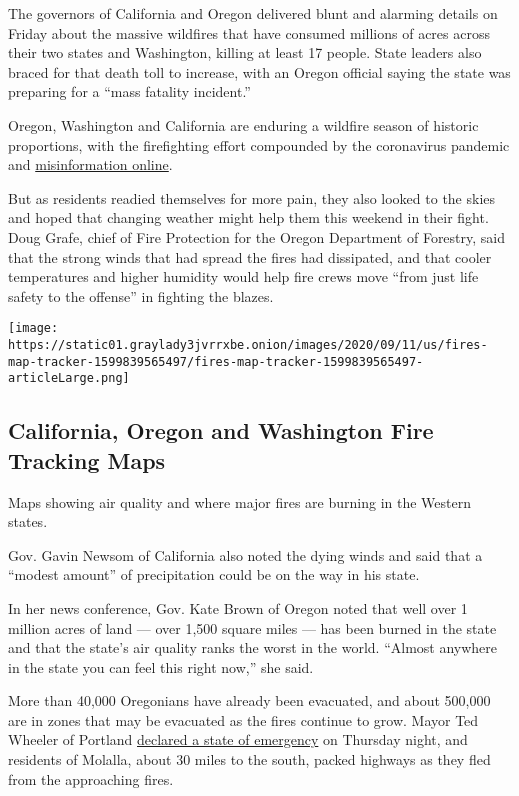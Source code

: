 The governors of California and Oregon delivered blunt and alarming
details on Friday about the massive wildfires that have consumed
millions of acres across their two states and Washington, killing at
least 17 people. State leaders also braced for that death toll to
increase, with an Oregon official saying the state was preparing for a
``mass fatality incident.''

Oregon, Washington and California are enduring a wildfire season of
historic proportions, with the firefighting effort compounded by the
coronavirus pandemic and
\href{https://www.nytimes3xbfgragh.onion/2020/09/10/us/wildfires-misinformation-arson-activists.html}{misinformation
online}.

But as residents readied themselves for more pain, they also looked to
the skies and hoped that changing weather might help them this weekend
in their fight. Doug Grafe, chief of Fire Protection for the Oregon
Department of Forestry, said that the strong winds that had spread the
fires had dissipated, and that cooler temperatures and higher humidity
would help fire crews move ``from just life safety to the offense'' in
fighting the blazes.

\href{https://www.nytimes3xbfgragh.onion/interactive/2020/us/fires-map-tracker.html}{}

\texttt{[image: https://static01.graylady3jvrrxbe.onion/images/2020/09/11/us/fires-map-tracker-1599839565497/fires-map-tracker-1599839565497-articleLarge.png]}

\hypertarget{california-oregon-and-washington-fire-tracking-maps}{%
\subsection{California, Oregon and Washington Fire Tracking
Maps}\label{california-oregon-and-washington-fire-tracking-maps}}

Maps showing air quality and where major fires are burning in the
Western states.

Gov. Gavin Newsom of California also noted the dying winds and said that
a ``modest amount'' of precipitation could be on the way in his state.

In her news conference, Gov. Kate Brown of Oregon noted that well over 1
million acres of land --- over 1,500 square miles --- has been burned in
the state and that the state's air quality ranks the worst in the world.
``Almost anywhere in the state you can feel this right now,'' she said.

More than 40,000 Oregonians have already been evacuated, and about
500,000 are in zones that may be evacuated as the fires continue to
grow. Mayor Ted Wheeler of Portland
\href{https://www.portland.gov/sites/default/files/2020-09/cop-fire-emergency-declaration-september-10-24-2020.pdf}{declared
a state of emergency} on Thursday night, and residents of Molalla, about
30 miles to the south, packed highways as they fled from the approaching
fires.

